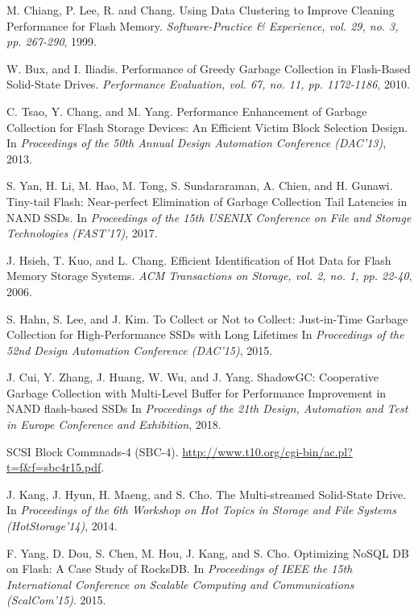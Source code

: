 \newpage


\begin{thebibliography}{00}

M. Chiang, P. Lee, R. and Chang.
Using Data Clustering to Improve Cleaning Performance for Flash Memory.
\textit{Software-Practice \& Experience, vol. 29, no. 3, pp. 267-290}, 1999.

W. Bux, and I. Iliadis.
Performance of Greedy Garbage Collection in Flash-Based Solid-State Drives.
\textit{Performance Evaluation, vol. 67, no. 11, pp. 1172-1186}, 2010.

C. Tsao, Y. Chang, and M. Yang.
Performance Enhancement of Garbage Collection for Flash Storage Devices: 
An Efficient Victim Block Selection Design.
In \textit{Proceedings of the 50th Annual Design Automation Conference (DAC'13)}, 2013.

S. Yan, H. Li, M. Hao, M. Tong, S. Sundararaman, A. Chien, and H. Gunawi.
Tiny-tail Flash: Near-perfect Elimination of Garbage Collection Tail Latencies in NAND SSDs.
In \textit{Proceedings of the 15th USENIX Conference on File and Storage Technologies (FAST'17)}, 2017.

J. Hsieh, T. Kuo, and L. Chang.
Efficient Identification of Hot Data for Flash Memory Storage Systems.
\textit{ACM Transactions on Storage, vol. 2, no. 1, pp. 22-40}, 2006.

S. Hahn, S. Lee, and J. Kim.
To Collect or Not to Collect: Just-in-Time Garbage Collection for High-Performance SSDs with Long Lifetimes
In \textit{Proceedings of the 52nd Design Automation Conference (DAC'15)}, 2015.

J. Cui, Y. Zhang, J. Huang, W. Wu, and J. Yang.
ShadowGC: Cooperative Garbage Collection with Multi-Level Buffer for Performance Improvement 
in NAND flash-based SSDs
In \textit{Proceedings of the 21th Design, Automation and Test in Europe Conference and Exhibition}, 2018.

SCSI Block Commnads-4 (SBC-4).
\url{http://www.t10.org/cgi-bin/ac.pl?t=f&f=sbc4r15.pdf}.

J. Kang, J. Hyun, H. Maeng, and S. Cho. 
The Multi-streamed Solid-State Drive.
In \textit{Proceedings of the 6th Workshop on Hot Topics in Storage and File Systems (HotStorage'14)}, 2014.

F. Yang, D. Dou, S. Chen, M. Hou, J. Kang, and S. Cho.
Optimizing NoSQL DB on Flash: A Case Study of RocksDB.
In \textit{Proceedings of IEEE the 15th International Conference on Scalable Computing
and Communications (ScalCom'15)}. 2015.


\end{thebibliography}
